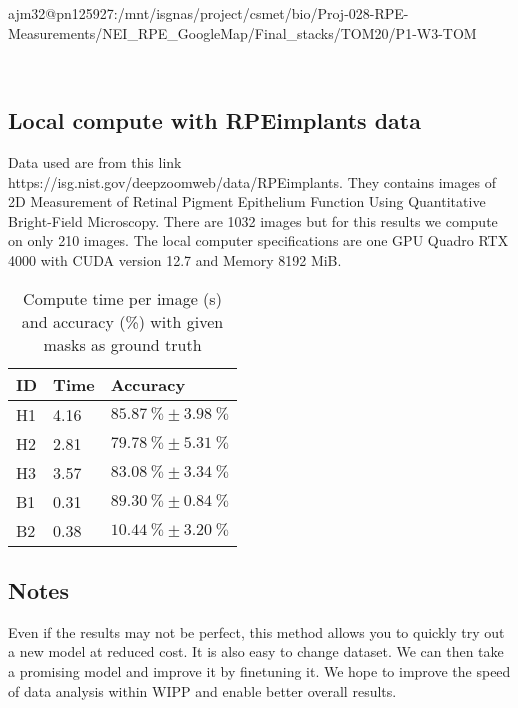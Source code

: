 ajm32@pn125927:/mnt/isgnas/project/csmet/bio/Proj-028-RPE-Measurements/NEI\_RPE\_GoogleMap/Final\_stacks/TOM20/P1-W3-TOM

\TODO\









\subsection{Local compute with RPEimplants data}

Data used are from this link https://isg.nist.gov/deepzoomweb/data/RPEimplants.
They contains images of 2D Measurement of Retinal Pigment Epithelium Function
Using Quantitative Bright-Field Microscopy. There are 1032 images but for this
results we compute on only 210 images. The local computer specifications are one
GPU Quadro RTX 4000 with CUDA version 12.7 and Memory 8192 MiB.

\begin{table}[H]
\centering
\caption{\label{tab:baseMask}%
  Compute time per image (s) and accuracy (\%) with given masks as ground truth
}
\begin{tabular}{lll}
  \toprule
  ID & Time & Accuracy \\
  \midrule
  H1 & 4.16 & $\SI{85.87}{\percent} \pm \SI{3.98}{\percent}$ \\
  H2 & 2.81 & $\SI{79.78}{\percent} \pm \SI{5.31}{\percent}$ \\
  H3 & 3.57 & $\SI{83.08}{\percent} \pm \SI{3.34}{\percent}$ \\
  B1 & 0.31 & $\SI{89.30}{\percent} \pm \SI{0.84}{\percent}$ \\
  B2 & 0.38 & $\SI{10.44}{\percent} \pm \SI{3.20}{\percent}$ \\
  \bottomrule
\end{tabular}
\end{table}

\subsection{Notes}

Even if the results may not be perfect, this method allows you to quickly try
out a new model at reduced cost. It is also easy to change dataset. We can then
take a promising model and improve it by finetuning it. We hope to improve the
speed of data analysis within WIPP and enable better overall results.
